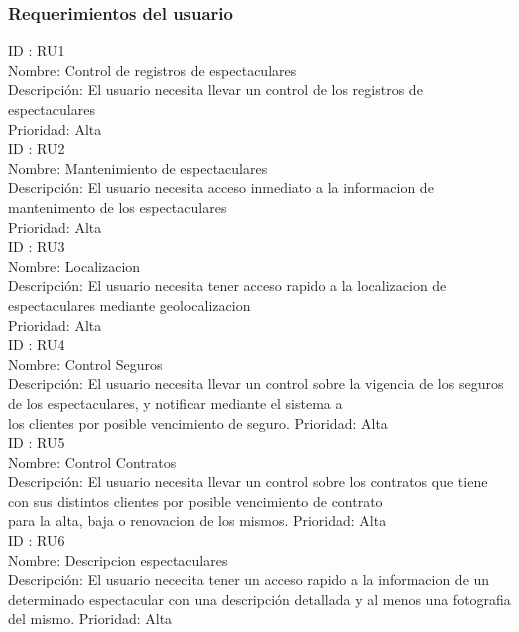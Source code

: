 \subsubsection{Requerimientos del usuario}


ID : RU1 \\
Nombre: Control de registros de espectaculares \\
Descripción:  El usuario necesita llevar un control de los registros de espectaculares \\
Prioridad: Alta\\

ID : RU2 \\
Nombre: Mantenimiento de espectaculares \\
Descripción:  El usuario necesita acceso inmediato a la informacion de mantenimento de los espectaculares \\
Prioridad: Alta\\

ID : RU3 \\
Nombre: Localizacion \\
Descripción:  El usuario necesita tener acceso rapido a la localizacion de espectaculares mediante geolocalizacion  \\
Prioridad: Alta\\

ID : RU4 \\
Nombre: Control Seguros \\
Descripción:  El usuario necesita llevar un control sobre la vigencia de los seguros de los espectaculares, y notificar mediante el sistema a\\ los clientes por posible vencimiento de seguro.
Prioridad: Alta\\

ID : RU5 \\
Nombre: Control Contratos \\
Descripción:  El usuario necesita llevar un control sobre los contratos que tiene con sus distintos clientes por posible vencimiento de contrato\\ para la alta, baja o renovacion de los mismos.
Prioridad: Alta\\

ID : RU6 \\
Nombre: Descripcion espectaculares \\
Descripción:  El usuario nececita tener un acceso rapido a la informacion de un determinado espectacular con una descripción detallada y al menos una fotografia del mismo.
Prioridad: Alta\\

